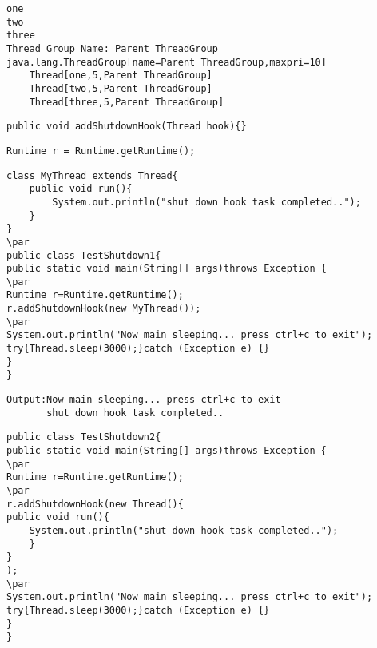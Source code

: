 \documentclass{book}
\def\lthtmlcheckvsize{\ifdim\ht\sizebox<\vsize 
  \ifdim\wd\sizebox<\hsize\expandafter\hfill\fi \expandafter\vfill
  \else\expandafter\vss\fi}%
\begin{document}
{\newpage\clearpage
{}%
\begin{lstlisting}
one
two
three
Thread Group Name: Parent ThreadGroup
java.lang.ThreadGroup[name=Parent ThreadGroup,maxpri=10]
    Thread[one,5,Parent ThreadGroup]
    Thread[two,5,Parent ThreadGroup]
    Thread[three,5,Parent ThreadGroup]
\end{lstlisting}%
\lthtmlfigureZ
\lthtmlcheckvsize\clearpage}

{\newpage\clearpage
{}%
\begin{lstlisting}
public void addShutdownHook(Thread hook){}  
\end{lstlisting}%
\lthtmlfigureZ
\lthtmlcheckvsize\clearpage}

{\newpage\clearpage
{}%
\begin{lstlisting}
Runtime r = Runtime.getRuntime();
\end{lstlisting}%
\lthtmlfigureZ
\lthtmlcheckvsize\clearpage}

{\newpage\clearpage
{}%
\begin{lstlisting}
class MyThread extends Thread{  
    public void run(){  
        System.out.println("shut down hook task completed..");  
    }  
}  
\par
public class TestShutdown1{  
public static void main(String[] args)throws Exception {  
\par
Runtime r=Runtime.getRuntime();  
r.addShutdownHook(new MyThread());  
\par
System.out.println("Now main sleeping... press ctrl+c to exit");  
try{Thread.sleep(3000);}catch (Exception e) {}  
}  
}  
\end{lstlisting}%
\lthtmlfigureZ
\lthtmlcheckvsize\clearpage}

{\newpage\clearpage
{}%
\begin{lstlisting}
Output:Now main sleeping... press ctrl+c to exit
       shut down hook task completed..
\end{lstlisting}%
\lthtmlfigureZ
\lthtmlcheckvsize\clearpage}

{\newpage\clearpage
{}%
\begin{lstlisting}
public class TestShutdown2{  
public static void main(String[] args)throws Exception {  
\par
Runtime r=Runtime.getRuntime();  
\par
r.addShutdownHook(new Thread(){  
public void run(){  
    System.out.println("shut down hook task completed..");  
    }  
}  
);  
\par
System.out.println("Now main sleeping... press ctrl+c to exit");  
try{Thread.sleep(3000);}catch (Exception e) {}  
}  
}  
\end{lstlisting}%
\lthtmlfigureZ
\lthtmlcheckvsize\clearpage}
\end{document}
